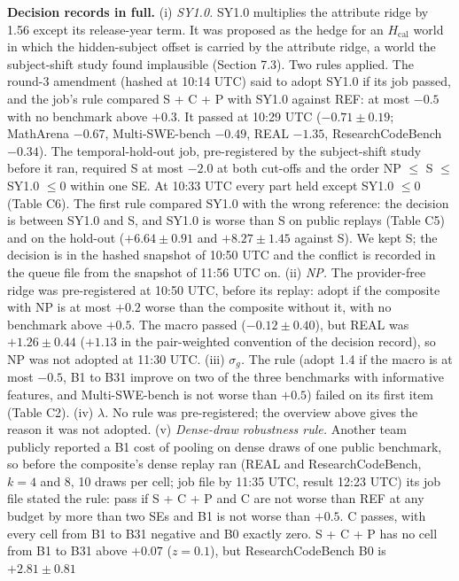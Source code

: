 \documentclass[
]{article}
\begin{document}
\textbf{Decision records in full.} (i) \emph{SY1.0.} SY1.0 multiplies
the attribute ridge by 1.56 except its release-year term. It was
proposed as the hedge for an \(H_{\mathrm{cal}}\) world in which the
hidden-subject offset is carried by the attribute ridge, a world the
subject-shift study found implausible (Section 7.3). Two rules applied.
The round-3 amendment (hashed at 10:14 UTC) said to adopt SY1.0 if its
job passed, and the job's rule compared S + C + P with SY1.0 against
REF: at most \(-0.5\) with no benchmark above \(+0.3\). It passed at
10:29 UTC (\(-0.71 \pm 0.19\); MathArena \(-0.67\), Multi-SWE-bench
\(-0.49\), REAL \(-1.35\), ResearchCodeBench \(-0.34\)). The
temporal-hold-out job, pre-registered by the subject-shift study before
it ran, required S at most \(-2.0\) at both cut-offs and the order NP
\(\le\) S \(\le\) SY1.0 \(\le 0\) within one SE. At 10:33 UTC every part
held except SY1.0 \(\le 0\) (Table C6). The first rule compared SY1.0
with the wrong reference: the decision is between SY1.0 and S, and SY1.0
is worse than S on public replays (Table C5) and on the hold-out
(\(+6.64 \pm 0.91\) and \(+8.27 \pm 1.45\) against S). We kept S; the
decision is in the hashed snapshot of 10:50 UTC and the conflict is
recorded in the queue file from the snapshot of 11:56 UTC on. (ii)
\emph{NP.} The provider-free ridge was pre-registered at 10:50 UTC,
before its replay: adopt if the composite with NP is at most \(+0.2\)
worse than the composite without it, with no benchmark above \(+0.5\).
The macro passed (\(-0.12 \pm 0.40\)), but REAL was \(+1.26 \pm 0.44\)
(\(+1.13\) in the pair-weighted convention of the decision record), so
NP was not adopted at 11:30 UTC. (iii) \emph{\(\sigma_g\).} The rule
(adopt 1.4 if the macro is at most \(-0.5\), B1 to B31 improve on two of
the three benchmarks with informative features, and Multi-SWE-bench is
not worse than \(+0.5\)) failed on its first item (Table C2). (iv)
\emph{\(\lambda\).} No rule was pre-registered; the overview above gives
the reason it was not adopted. (v) \emph{Dense-draw robustness rule.}
Another team publicly reported a B1 cost of pooling on dense draws of
one public benchmark, so before the composite's dense replay ran (REAL
and ResearchCodeBench, \(k = 4\) and 8, 10 draws per cell; job file by
11:35 UTC, result 12:23 UTC) its job file stated the rule: pass if S + C
+ P and C are not worse than REF at any budget by more than two SEs and
B1 is not worse than \(+0.5\). C passes, with every cell from B1 to B31
negative and B0 exactly zero. S + C + P has no cell from B1 to B31 above
\(+0.07\) (\(z = 0.1\)), but ResearchCodeBench B0 is \(+2.81 \pm 0.81\)
\end{document}

